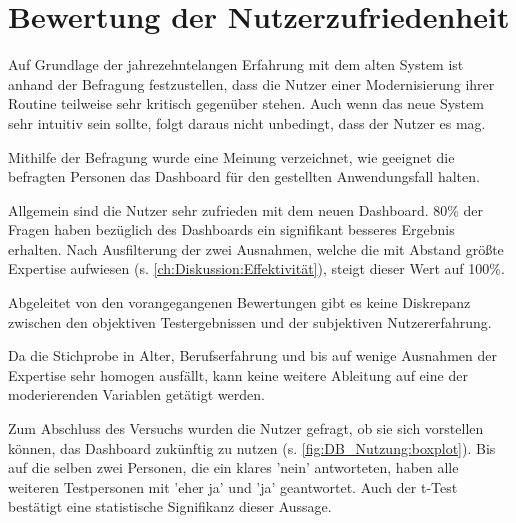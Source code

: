 \section{Bewertung der Nutzerzufriedenheit}
\label{ch:Diskussion:Zufriedenheit}

Auf Grundlage der jahrezehntelangen Erfahrung mit dem alten System ist anhand der Befragung festzustellen, dass die Nutzer einer Modernisierung ihrer Routine teilweise sehr kritisch gegenüber stehen. Auch wenn das neue System sehr intuitiv sein sollte, folgt daraus nicht unbedingt, dass der Nutzer es mag.

Mithilfe der Befragung wurde eine Meinung verzeichnet, wie geeignet die befragten Personen das Dash\-board für den gestellten Anwendungsfall halten.

Allgemein sind die Nutzer sehr zufrieden mit dem neuen Dash\-board. 80\% der Fragen haben bezüglich des Dash\-boards ein signifikant besseres Ergebnis erhalten. Nach Ausfilterung der zwei Ausnahmen, welche die mit Abstand größte Expertise aufwiesen (s. \autoref{ch:Diskussion:Effektivität}), steigt dieser Wert auf 100\%.

Abgeleitet von den vorangegangenen Bewertungen gibt es keine Diskrepanz zwischen den objektiven Testergebnissen und der subjektiven Nutzererfahrung.

Da die Stichprobe in Alter, Berufserfahrung und bis auf wenige Ausnahmen der Expertise sehr homogen ausfällt, kann keine weitere Ableitung auf eine der moderierenden Variablen getätigt werden. 


Zum Abschluss des Versuchs wurden die Nutzer gefragt, ob sie sich vorstellen können, das Dash\-board zukünftig zu nutzen (s. \autoref{fig:DB_Nutzung:boxplot}). Bis auf die selben zwei Personen, die ein klares 'nein' antworteten, haben alle weiteren Testpersonen mit 'eher ja' und 'ja' geantwortet. Auch der t-Test bestätigt eine statistische Signifikanz dieser Aussage.
